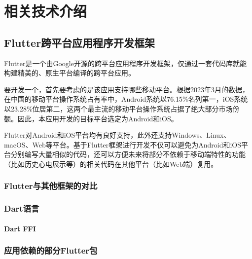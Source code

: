 

\chapter{相关技术介绍}\label{ch:tech}


\section{Flutter跨平台应用程序开发框架}\label{sec:flutter}

Flutter是一个由Google开源的跨平台应用程序开发框架，仅通过一套代码库就能构建精美的、原生平台编译的跨平台应用\cite{FlutterBuildApps}。

要开发一个\app ，首先要考虑的是该应用支持哪些移动平台。根据2023年3月的数据\cite{MobileOperatingSystem}，在中国的移动平台操作系统占有率中，Android系统以76.15\%名列第一，iOS系统以23.28\%位居第二，这两个最主流的移动平台操作系统占据了绝大部分市场份额。因此，本应用开发的目标平台选定为Android和iOS。

Flutter对Android和iOS平台均有良好支持，此外还支持Windows、Linux、macOS、Web等平台\cite{SupportedDeploymentPlatforms}。基于Flutter框架进行开发不仅可以避免为Android和iOS平台分别编写大量相似的代码，还可以方便未来将部分不依赖于移动端特性的功能（比如历史心电展示等）的相关代码在其他平台（比如Web端）复用。

\subsection{Flutter与其他框架的对比}\label{subsec:flutter-compare}


\subsection{Dart语言}\label{subsec:dart}



\subsubsection{Dart FFI}\label{subsubsec:ffi}


\subsection{应用依赖的部分Flutter包}\label{subsec:flutter-packages}

